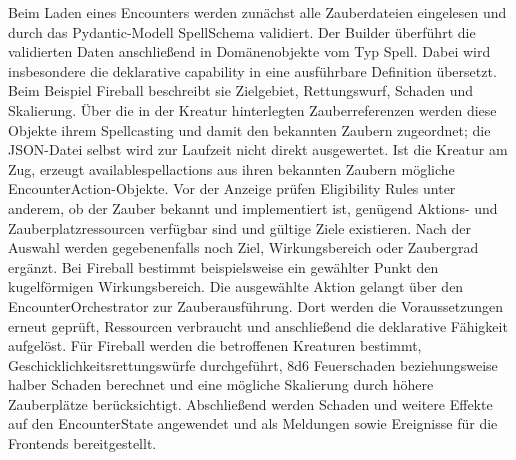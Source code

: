 {}Beim Laden eines Encounters werden zunächst alle Zauberdateien eingelesen und durch das Pydantic-Modell SpellSchema validiert. Der Builder überführt die validierten Daten anschließend in Domänenobjekte vom Typ Spell. Dabei wird insbesondere die deklarative capability in eine ausführbare Definition übersetzt. Beim Beispiel Fireball beschreibt sie Zielgebiet, Rettungswurf, Schaden und Skalierung. Über die in der Kreatur hinterlegten Zauberreferenzen werden diese Objekte ihrem Spellcasting und damit den bekannten Zaubern zugeordnet; die JSON-Datei selbst wird zur Laufzeit nicht direkt ausgewertet.\markdownRendererSoftLineBreak
{}Ist die Kreatur am Zug, erzeugt available\markdownRendererUnderscore{}spell\markdownRendererUnderscore{}actions aus ihren bekannten Zaubern mögliche EncounterAction-Objekte. Vor der Anzeige prüfen Eligibility Rules unter anderem, ob der Zauber bekannt und implementiert ist, genügend Aktions- und Zauberplatzressourcen verfügbar sind und gültige Ziele existieren. Nach der Auswahl werden gegebenenfalls noch Ziel, Wirkungsbereich oder Zaubergrad ergänzt. Bei Fireball bestimmt beispielsweise ein gewählter Punkt den kugelförmigen Wirkungsbereich.\markdownRendererSoftLineBreak
{}Die ausgewählte Aktion gelangt über den EncounterOrchestrator zur Zauberausführung. Dort werden die Voraussetzungen erneut geprüft, Ressourcen verbraucht und anschließend die deklarative Fähigkeit aufgelöst. Für Fireball werden die betroffenen Kreaturen bestimmt, Geschicklichkeitsrettungswürfe durchgeführt, 8d6 Feuerschaden beziehungsweise halber Schaden berechnet und eine mögliche Skalierung durch höhere Zauberplätze berücksichtigt. Abschließend werden Schaden und weitere Effekte auf den EncounterState angewendet und als Meldungen sowie Ereignisse für die Frontends bereitgestellt.\markdownRendererParagraphSeparator
{}\markdownRendererParagraphSeparator
